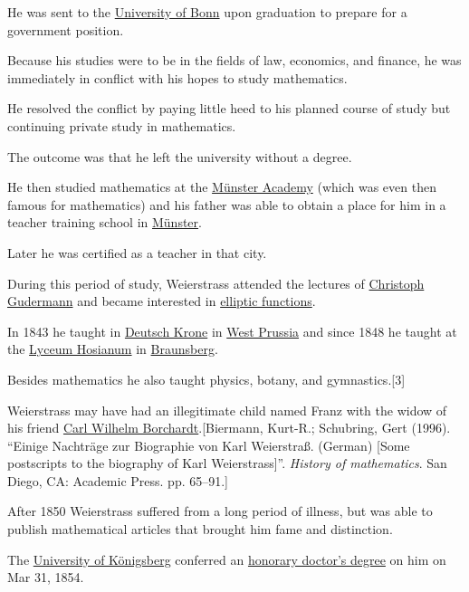 \documentclass{book}
\numberwithin{equation}{section}
\begin{document}
He was sent to the \href{https://en.wikipedia.org/wiki/University_of_Bonn}{University of Bonn} upon graduation to prepare for a government position.

Because his studies were to be in the fields of law, economics, and finance, he was immediately in conflict with his hopes to study mathematics.

He resolved the conflict by paying little heed to his planned course of study but continuing private study in mathematics.

The outcome was that he left the university without a degree.

He then studied mathematics at the \href{https://en.wikipedia.org/wiki/University_of_M%C3%BCnster}{Münster Academy} (which was even then famous for mathematics) and his father was able to obtain a place for him in a teacher training school in \href{https://en.wikipedia.org/wiki/M%C3%BCnster}{Münster}.

Later he was certified as a teacher in that city.

During this period of study, Weierstrass attended the lectures of \href{https://en.wikipedia.org/wiki/Christoph_Gudermann}{Christoph Gudermann} and became interested in \href{https://en.wikipedia.org/wiki/Elliptic_function}{elliptic functions}.

%
In 1843 he taught in \href{https://en.wikipedia.org/wiki/Wa%C5%82cz}{Deutsch Krone} in \href{https://en.wikipedia.org/wiki/West_Prussia}{West Prussia} and since 1848 he taught at the \href{https://en.wikipedia.org/wiki/Collegium_Hosianum}{Lyceum Hosianum} in \href{https://en.wikipedia.org/wiki/Braunsberg}{Braunsberg}.
    
Besides mathematics he also taught physics, botany, and gymnastics.[3]

%
Weierstrass may have had an illegitimate child named Franz with the widow of his friend \href{https://en.wikipedia.org/wiki/Carl_Wilhelm_Borchardt}{Carl Wilhelm Borchardt}.[Biermann, Kurt-R.; Schubring, Gert (1996). ``Einige Nachträge zur Biographie von Karl Weierstraß. (German) [Some postscripts to the biography of Karl Weierstrass]''. \textit{History of mathematics}. San Diego, CA: Academic Press. pp. 65--91.]

%
After 1850 Weierstrass suffered from a long period of illness, but was able to publish mathematical articles that brought him fame and distinction.

The \href{https://en.wikipedia.org/wiki/University_of_K%C3%B6nigsberg}{University of Königsberg} conferred an \href{https://en.wikipedia.org/wiki/Honorary_doctor%27s_degree}{honorary doctor's degree} on him on Mar 31, 1854.
    
\end{document}
